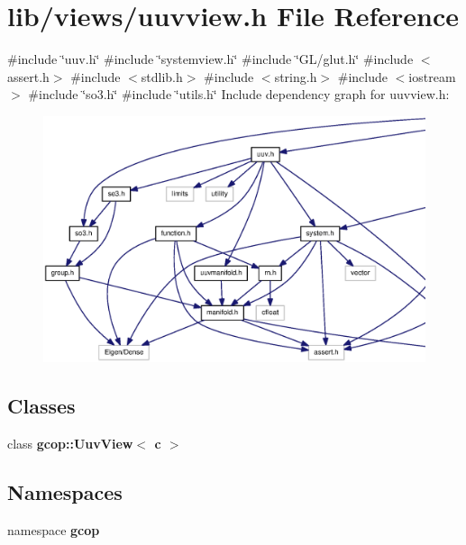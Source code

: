 \section{lib/views/uuvview.h \-File \-Reference}
\label{uuvview_8h}
{\ttfamily \#include \char`\"{}uuv.\-h\char`\"{}}\*
{\ttfamily \#include \char`\"{}systemview.\-h\char`\"{}}\*
{\ttfamily \#include \char`\"{}\-G\-L/glut.\-h\char`\"{}}\*
{\ttfamily \#include $<$assert.\-h$>$}\*
{\ttfamily \#include $<$stdlib.\-h$>$}\*
{\ttfamily \#include $<$string.\-h$>$}\*
{\ttfamily \#include $<$iostream$>$}\*
{\ttfamily \#include \char`\"{}so3.\-h\char`\"{}}\*
{\ttfamily \#include \char`\"{}utils.\-h\char`\"{}}\*
\-Include dependency graph for uuvview.\-h\-:
\nopagebreak
\begin{figure}[H]
\begin{center}
\leavevmode
\includegraphics[width=350pt]{uuvview_8h__incl}
\end{center}
\end{figure}
\subsection*{\-Classes}
\begin{DoxyCompactItemize}
\item 
class {\bf gcop\-::\-Uuv\-View$<$ c $>$}
\end{DoxyCompactItemize}
\subsection*{\-Namespaces}
\begin{DoxyCompactItemize}
\item 
namespace {\bf gcop}
\end{DoxyCompactItemize}
